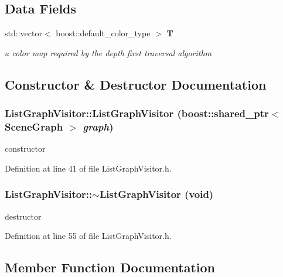 \subsection*{Data Fields}
\begin{CompactItemize}
\item 
std::vector$<$ boost::default\_\-color\_\-type $>$ {\bf T}
\begin{CompactList}\small\item\em a color map required by the depth first traversal algorithm \item\end{CompactList}\end{CompactItemize}


\subsection{Constructor \& Destructor Documentation}
\subsubsection{\setlength{\rightskip}{0pt plus 5cm}ListGraphVisitor::ListGraphVisitor (boost::shared\_\-ptr$<$ {\bf SceneGraph} $>$ {\em graph})\hspace{0.3cm}{\tt  [inline]}}\label{classListGraphVisitor_979dcaa51c8861959024ded62b97937d}


constructor 



Definition at line 41 of file ListGraphVisitor.h.
\subsubsection{\setlength{\rightskip}{0pt plus 5cm}ListGraphVisitor::$\sim$ListGraphVisitor (void)\hspace{0.3cm}{\tt  [inline]}}\label{classListGraphVisitor_ce76d0b68b0ea97e3792400872347877}


destructor 



Definition at line 55 of file ListGraphVisitor.h.

\subsection{Member Function Documentation}

